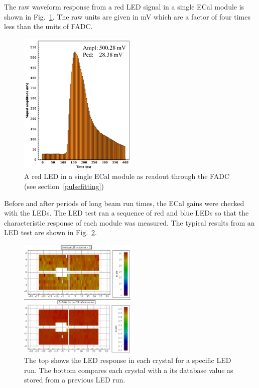 The raw waveform response from a red LED signal in a single ECal module is shown in Fig.~\ref{Figure:redSignal}. The raw units are given in mV which are a factor of four times less than the units of FADC.

\begin{figure}[htb]
  \centering
      \includegraphics[width=0.5\textwidth]{pics/experiment/ledSignal.png}
  \caption[LED signal in ECal FADC]{A red LED in a single ECal module as readout through the FADC (see section~\ref{pulsefitting})}
  \label{Figure:redSignal}
\end{figure}

Before and after periods of long beam run times, the ECal gains were checked with the LEDs. The LED test ran a sequence of red and blue LEDs so that the characteristic response of each module was measured. The typical results from an LED test are shown in Fig.~\ref{Figure:redCompare}.

\begin{figure}[htb]
  \centering
      \includegraphics[width=0.5\textwidth]{pics/experiment/ledCompare.png}
  \caption[Results of a single LED run]{The top shows the LED response in each crystal for a specific LED run. The bottom compares each crystal with a its database value as stored from a previous LED run.}
  \label{Figure:redCompare}
\end{figure}

